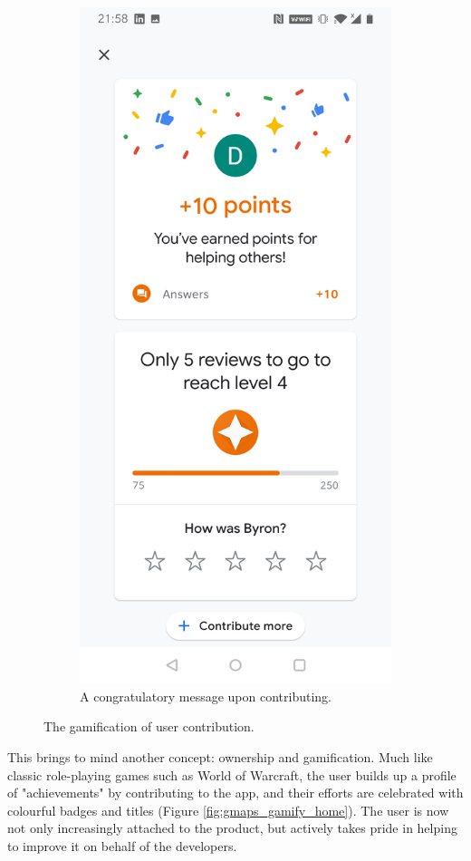 \begin{figure}[htb!]
\begin{center}
\begin{subfigure}{.3\textwidth}
            \includegraphics[width=0.8\linewidth]{images/gmaps_gamified_complete.jpg}
            \caption{A congratulatory message upon contributing.}
            \label{fig:gmaps_gamify_congrat}
        \end{subfigure}%
        \caption{The gamification of user contribution.}
        \label{fig:gmaps_gamification}
    \end{center}
\end{figure}

This brings to mind another concept: ownership and gamification. Much like classic role-playing games such as World of Warcraft, the user builds up a profile of "achievements" by contributing to the app, and their efforts are celebrated with colourful badges and titles (Figure \ref{fig:gmaps_gamify_home}). The user is now not only increasingly attached to the product, but actively takes pride in helping to improve it on behalf of the developers.

